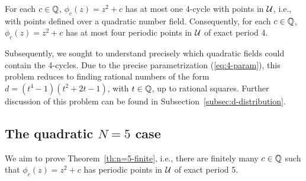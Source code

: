 \begin{theorem}
  For each $c \in \mathbb{Q}$, $\phi_c(z) = z^2 + c$ has at most one 4-cycle
  with points in $\mathcal{U}$, i.e., with points defined over a quadratic
  number field. Consequently, for each $c \in \mathbb{Q}$, $\phi_c(z) = z^2 +
  c$ has at most four periodic points in $\mathcal{U}$ of exact period 4.
\end{theorem}

Subsequently, we sought to understand precisely which quadratic fields
could contain the 4-cycles. Due to the precise parametrization
(\ref{eq:4-param}), this problem reduces to finding rational numbers
of the form $d = (t^4 - 1)(t^2 + 2t - 1)$, with $t \in \mathbb{Q}$, up to
rational squares. Further discussion of this problem can be found in
Subsection~\ref{subsec:d-distribution}.

\subsection{The quadratic $N = 5$ case}
\label{subsec:quadratic-5}

We aim to prove Theorem~\ref{th:n=5-finite}, i.e., there are finitely
many $c \in \mathbb{Q}$ such that $\phi_c(z) = z^2 + c$ has periodic points in
$\mathcal{U}$ of exact period 5.

